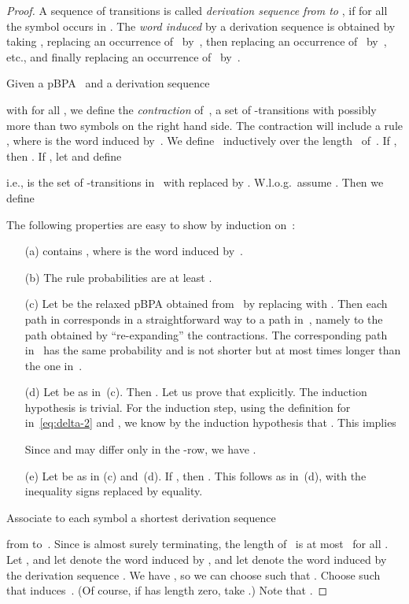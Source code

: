 \begin{proof}
\newcommand{\Con}{\mathit{Con}}
A sequence of transitions  is called {\em derivation sequence from  to },
 if for all  the symbol  occurs in .
The {\em word induced} by a derivation sequence 
 is obtained by taking , replacing an occurrence of~ by~,
 then replacing an occurrence of~ by~, etc., and finally replacing an occurrence of~ by~.

Given a pBPA~ and a derivation sequence
 
 with  for all ,
we define the {\em contraction}  of~, a set of -transitions with possibly more than two symbols on the right hand side.
The contraction  will include a rule , where  is the word induced by~.
We define~ inductively over the length~ of~.
If , then .
If , let  and define
 
 i.e.,  is the set of -transitions in~ with  replaced by .
W.l.o.g.\ assume .
Then we define
 
The following properties are easy to show by induction on~:
\begin{itemize}
 \item[(a)]
   contains , where  is the word induced by~.
 \item[(b)]
  The rule probabilities are at least .
 \item[(c)]
  Let  be the relaxed pBPA obtained from~ by replacing  with .
  Then each path in  corresponds in a straightforward way to a path in~,
   namely to the path obtained by ``re-expanding'' the contractions.
  The corresponding path in~ has the same probability
   and is not shorter but at most  times longer than the one in~.
 \item[(d)]
  Let  be as in~(c).
  Then .
  Let us prove that explicitly.
  The induction hypothesis  is trivial.
  For the induction step, using the definition for~ in~\eqref{eq:delta-2} and
   ,
   we know by the induction hypothesis that .
  This implies
   
   Since  and  may differ only in the -row, we have .
 \item[(e)]
  Let  be as in (c) and~(d).
  If , then .
  This follows as in~(d), with the inequality signs replaced by equality.
\end{itemize}

Associate to each symbol  a shortest derivation sequence
 
  from  to~.
Since  is almost surely terminating, the length of~ is at most~ for all .
Let ,
 and let  denote the word induced by ,
 and let  denote the word induced by the derivation sequence .
We have ,
 so we can choose  such that .
Choose  such that  induces~.
(Of course, if  has length zero, take .)
Note that .


\end{proof}
